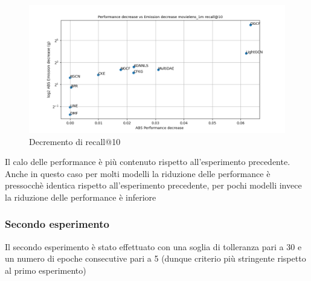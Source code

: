 \begin{figure}[H]
    \centering
     \includegraphics[width=\textwidth]{images/decrement_recall@10_movielens_1m_40_5.png}
    \caption{Decremento di recall@10}
\end{figure}
\noindent Il calo delle performance è più contenuto rispetto all'esperimento precedente. Anche in questo caso per molti modelli la riduzione delle performance è pressocchè identica rispetto all'esperimento precedente, per pochi modelli invece la riduzione delle performance è inferiore


\subsubsection{Secondo esperimento}
Il secondo esperimento è stato effettuato con una soglia di tolleranza pari a 30 e un numero di epoche consecutive pari a 5 (dunque criterio più stringente rispetto al primo esperimento)

